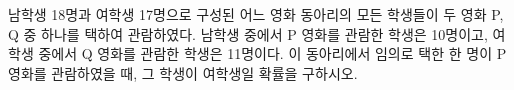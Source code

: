 남학생 18명과 여학생 17명으로 구성된 어느 영화 동아리의 모든 학생들이 두 영화 P, Q 중 하나를 택하여 관람하였다. 남학생 중에서 P 영화를 관람한 학생은 10명이고, 여학생 중에서 Q 영화를 관람한 학생은 11명이다. 이 동아리에서 임의로 택한 한 명이 P 영화를 관람하였을 때, 그 학생이 여학생일 확률을 구하시오.

